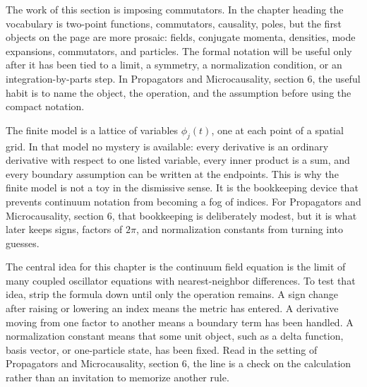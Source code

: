 











The work of this section is imposing commutators.  In the chapter heading the vocabulary is two-point functions, commutators, causality, poles, but the first objects on the page are more prosaic: fields, conjugate momenta, densities, mode expansions, commutators, and particles.  The formal notation will be useful only after it has been tied to a limit, a symmetry, a normalization condition, or an integration-by-parts step.  In Propagators and Microcausality, section 6, the useful habit is to name the object, the operation, and the assumption before using the compact notation.

The finite model is a lattice of variables \(\phi_j(t)\), one at each point of a spatial grid.  In that model no mystery is available: every derivative is an ordinary derivative with respect to one listed variable, every inner product is a sum, and every boundary assumption can be written at the endpoints.  This is why the finite model is not a toy in the dismissive sense.  It is the bookkeeping device that prevents continuum notation from becoming a fog of indices.  For Propagators and Microcausality, section 6, that bookkeeping is deliberately modest, but it is what later keeps signs, factors of \(2\pi\), and normalization constants from turning into guesses.

The central idea for this chapter is the continuum field equation is the limit of many coupled oscillator equations with nearest-neighbor differences.  To test that idea, strip the formula down until only the operation remains.  A sign change after raising or lowering an index means the metric has entered.  A derivative moving from one factor to another means a boundary term has been handled.  A normalization constant means that some unit object, such as a delta function, basis vector, or one-particle state, has been fixed.  Read in the setting of Propagators and Microcausality, section 6, the line is a check on the calculation rather than an invitation to memorize another rule.

